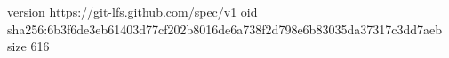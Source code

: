 version https://git-lfs.github.com/spec/v1
oid sha256:6b3f6de3eb61403d77cf202b8016de6a738f2d798e6b83035da37317c3dd7aeb
size 616

